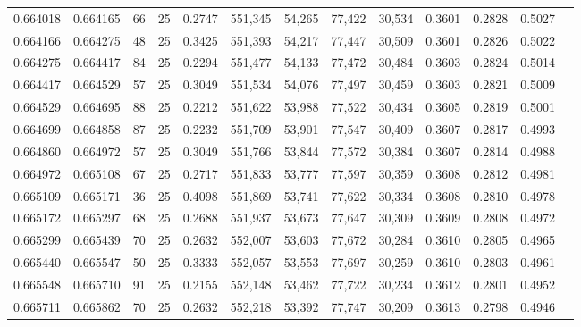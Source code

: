 \begin{tabular}{rrrrrrrrrrrrr}
0.664018 & 0.664165 &    66 &  25 &                                     0.2747 & 551,345 &  54,265 &  77,422 &  30,534 & 0.3601 & 0.2828 & 0.5027 \\
0.664166 & 0.664275 &    48 &  25 &                                     0.3425 & 551,393 &  54,217 &  77,447 &  30,509 & 0.3601 & 0.2826 & 0.5022 \\
0.664275 & 0.664417 &    84 &  25 &                                     0.2294 & 551,477 &  54,133 &  77,472 &  30,484 & 0.3603 & 0.2824 & 0.5014 \\
0.664417 & 0.664529 &    57 &  25 &                                     0.3049 & 551,534 &  54,076 &  77,497 &  30,459 & 0.3603 & 0.2821 & 0.5009 \\
0.664529 & 0.664695 &    88 &  25 &                                     0.2212 & 551,622 &  53,988 &  77,522 &  30,434 & 0.3605 & 0.2819 & 0.5001 \\
0.664699 & 0.664858 &    87 &  25 &                                     0.2232 & 551,709 &  53,901 &  77,547 &  30,409 & 0.3607 & 0.2817 & 0.4993 \\
0.664860 & 0.664972 &    57 &  25 &                                     0.3049 & 551,766 &  53,844 &  77,572 &  30,384 & 0.3607 & 0.2814 & 0.4988 \\
0.664972 & 0.665108 &    67 &  25 &                                     0.2717 & 551,833 &  53,777 &  77,597 &  30,359 & 0.3608 & 0.2812 & 0.4981 \\
0.665109 & 0.665171 &    36 &  25 &                                     0.4098 & 551,869 &  53,741 &  77,622 &  30,334 & 0.3608 & 0.2810 & 0.4978 \\
0.665172 & 0.665297 &    68 &  25 &                                     0.2688 & 551,937 &  53,673 &  77,647 &  30,309 & 0.3609 & 0.2808 & 0.4972 \\
0.665299 & 0.665439 &    70 &  25 &                                     0.2632 & 552,007 &  53,603 &  77,672 &  30,284 & 0.3610 & 0.2805 & 0.4965 \\
0.665440 & 0.665547 &    50 &  25 &                                     0.3333 & 552,057 &  53,553 &  77,697 &  30,259 & 0.3610 & 0.2803 & 0.4961 \\
0.665548 & 0.665710 &    91 &  25 &                                     0.2155 & 552,148 &  53,462 &  77,722 &  30,234 & 0.3612 & 0.2801 & 0.4952 \\
0.665711 & 0.665862 &    70 &  25 &                                     0.2632 & 552,218 &  53,392 &  77,747 &  30,209 & 0.3613 & 0.2798 & 0.4946 \\

\end{tabular}
